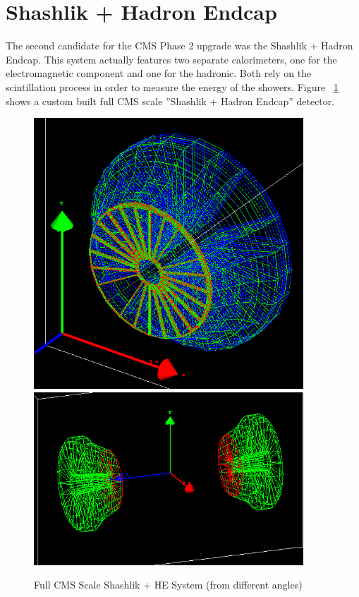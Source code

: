 \section{Shashlik + Hadron Endcap} \label{section:simulations_shashlik}
The second candidate for the CMS Phase 2 upgrade was the Shashlik + Hadron Endcap. This system actually features two separate calorimeters, one for the electromagnetic component and one for the hadronic. Both rely on the scintillation process in order to measure the energy of the showers. Figure ~\ref{fig:higgs_simulations_shashlikexamples} shows a custom built full CMS scale ''Shashlik + Hadron Endcap'' detector.
\begin{figure}[htbp]
    \centering
    \includegraphics[width=0.9\textwidth]{figures/ch_simulations/shashlik/geometry/Shashlik+HE_Complete_Wire.png}\\
    \includegraphics[width=0.9\textwidth]{figures/ch_simulations/shashlik/geometry/SHE_70_20.png}
    \caption{Full CMS Scale Shashlik + HE System (from different angles)}
    \label{fig:higgs_simulations_shashlikexamples}
 \end{figure}

